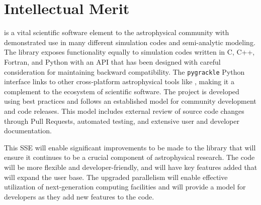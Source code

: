 \section{Intellectual Merit}

\grackle{} is a vital scientific software element to the astrophysical
community with demonstrated use in many different simulation codes and
semi-analytic modeling.  The library exposes functionality equally to
simulation codes written in C, C++, Fortran, and Python with an API
that has been designed with careful consideration for maintaining
backward compatibility.  The \texttt{pygrackle} Python interface links
\grackle{} to other cross-platform astrophysical tools like \yt{},
making it a complement to the ecosystem of scientific software.
The \grackle{} project is developed using
best practices and follows an established model for community
development and code releases.  This model includes external review of
source code changes through Pull Requests, automated testing, and
extensive user and developer documentation.

This SSE will enable significant improvements to be made to the
\grackle{} library that will ensure it continues to be a crucial
component of astrophysical research.  The code will be more flexible
and developer-friendly, and will have key features added that will
expand the user base.  The upgraded parallelism will enable
effective utilization of next-generation computing facilities and will
provide a model for developers as they add new features to the code.
